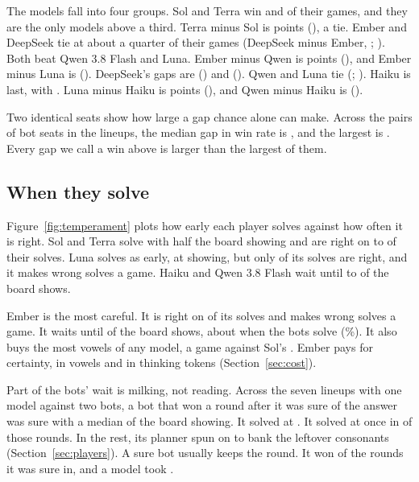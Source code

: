 The models fall into four groups. Sol and Terra win \SolWin{} and \TerraWin{} of their games, and they are the only models above a third. Terra minus Sol is \PairTerraMinusSol{} points (\PairTerraMinusSolCI), a tie. Ember and DeepSeek tie at about a quarter of their games (DeepSeek minus Ember, \PairDeepseekMinusEmber{}; \PairDeepseekMinusEmberCI). Both beat Qwen 3.8 Flash and Luna. Ember minus Qwen is \PairEmberMinusQwenFlash{} points (\PairEmberMinusQwenFlashCI), and Ember minus Luna is \PairEmberMinusLuna{} (\PairEmberMinusLunaCI). DeepSeek's gaps are \PairDeepseekMinusQwenFlash{} (\PairDeepseekMinusQwenFlashCI) and \PairDeepseekMinusLuna{} (\PairDeepseekMinusLunaCI). Qwen and Luna tie (\PairQwenFlashMinusLuna{}; \PairQwenFlashMinusLunaCI). Haiku is last, with \HaikuWin{}. Luna minus Haiku is \PairLunaMinusHaiku{} points (\PairLunaMinusHaikuCI), and Qwen minus Haiku is \PairQwenFlashMinusHaiku{} (\PairQwenFlashMinusHaikuCI).

Two identical seats show how large a gap chance alone can make. Across the \NoisePairs{} pairs of bot seats in the lineups, the median gap in win rate is \NoiseMedian{}, and the largest is \NoiseLargest{}. Every gap we call a win above is larger than the largest of them.

\subsection{When they solve}

Figure~\ref{fig:temperament} plots how early each player solves against how often it is right. Sol and Terra solve with half the board showing and are right on \TerraAcc{} to \SolAcc{} of their solves. Luna solves as early, at \LunaShown{} showing, but only \LunaAcc{} of its solves are right, and it makes \LunaWrong{} wrong solves a game. Haiku and Qwen 3.8 Flash wait until \QwenShown{} to \HaikuShown{} of the board shows.

Ember is the most careful. It is right on \EmberAcc{} of its solves and makes \EmberWrong{} wrong solves a game. It waits until \EmberShown{} of the board shows, about when the bots solve (\BotShownRange\%). It also buys the most vowels of any model, \EmberVowels{} a game against Sol's \SolVowels{}. Ember pays for certainty, in vowels and in thinking tokens (Section~\ref{sec:cost}).

Part of the bots' wait is milking, not reading. Across the seven lineups with one model against two bots, a bot that won a round after it was sure of the answer was sure with a median \BotSureShown{} of the board showing. It solved at \BotSureSolveShown. It solved at once in \BotSureOnSpot{} of those rounds. In the rest, its planner spun on to bank the leftover consonants (Section~\ref{sec:players}). A sure bot usually keeps the round. It won \BotSureWon{} of the \BotSureRounds{} rounds it was sure in, and a model took \BotSureLostModel.

